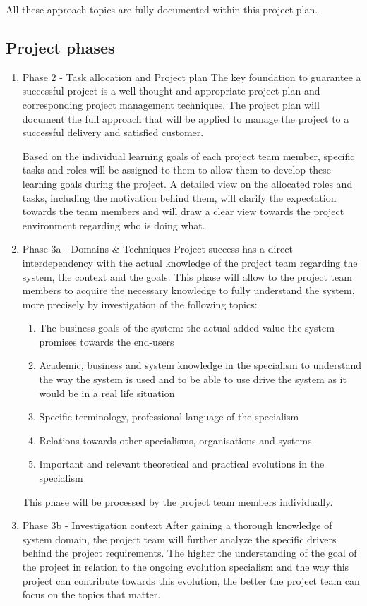 All these approach topics are fully documented within this project plan.


\subsection{Project phases}

 \begin{enumerate}
	\item Phase 2 - Task allocation and Project plan
		The key foundation to guarantee a successful project is a well thought and appropriate project plan and corresponding project management techniques.
		The project plan will document the full approach that will be applied to manage the project to a successful delivery and satisfied customer.
		
		Based on the individual learning goals of each project team member, specific tasks and roles will be assigned to them to allow them to develop these learning goals during the project.
		A detailed view on the allocated roles and tasks, including the motivation behind them, will clarify the expectation towards the team members and will draw a clear view towards the project environment regarding who is doing what.
	\item Phase 3a - Domains \& Techniques
		Project success has a direct interdependency with the actual knowledge of the project team regarding the system, the context and the goals.
		This phase will allow to the project team members to acquire the necessary knowledge to fully understand  the system, more precisely by investigation of the following topics:

 		\begin{enumerate}
			\item The business goals of the system: the actual added value the system promises towards the end-users
			\item Academic, business and system knowledge in the specialism to understand the way the system is used and to be able to use drive the system as it would be in a real life situation
			\item Specific terminology, professional language of the specialism
			\item Relations towards other specialisms, organisations and systems
			\item Important and relevant theoretical and practical evolutions in the specialism
		\end {enumerate}

		This phase will be processed by the project team members individually.
 	\item Phase 3b - Investigation context
		After gaining a thorough knowledge of system domain, the project team will further analyze the specific drivers behind the project requirements.
		The higher the understanding of the goal of the project in relation to the ongoing evolution specialism and the way this project can contribute towards this evolution, the better the project team can focus on the topics that matter.
	

\end{enumerate}
